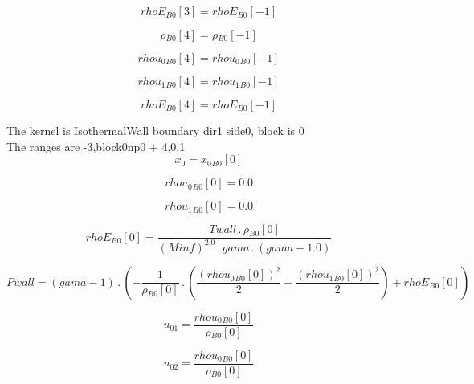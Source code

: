 \documentclass{article}
\begin{document}
\begin{dmath}{rhoE{_{B0}}}[{3}] = {rhoE{_{B0}}}[{-1}]\end{dmath}

\begin{dmath}{\rho{_{B0}}}[{4}] = {\rho{_{B0}}}[{-1}]\end{dmath}

\begin{dmath}{rhou_{0}{_{B0}}}[{4}] = {rhou_{0}{_{B0}}}[{-1}]\end{dmath}

\begin{dmath}{rhou_{1}{_{B0}}}[{4}] = {rhou_{1}{_{B0}}}[{-1}]\end{dmath}

\begin{dmath}{rhoE{_{B0}}}[{4}] = {rhoE{_{B0}}}[{-1}]\end{dmath}

\noindent The kernel is IsothermalWall boundary dir1 side0, block is 0\\\noindent The ranges are -3,block0np0 + 4,0,1\\\begin{dmath}x_{0} = {x_{0}{_{B0}}}[{0}]\end{dmath}

\begin{dmath}{rhou_{0}{_{B0}}}[{0}] = 0.0\end{dmath}

\begin{dmath}{rhou_{1}{_{B0}}}[{0}] = 0.0\end{dmath}

\begin{dmath}{rhoE{_{B0}}}[{0}] = \frac{Twall \,.\, {\rho{_{B0}}}[{0}]}{\left(Minf \right)^{2.0} \,.\, gama \,.\, \left(gama - 1.0\right)}\end{dmath}

\begin{dmath}Pwall = \left(gama - 1\right) \,.\, \left(- \frac{1}{{\rho{_{B0}}}[{0}]} \,.\, \left(\frac{\left({rhou_{0}{_{B0}}}[{0}] \right)^{2}}{2} + \frac{\left({rhou_{1}{_{B0}}}[{0}] \right)^{2}}{2}\right) + {rhoE{_{B0}}}[{0}]\right)\end{dmath}

\begin{dmath}u_{01} = \frac{{rhou_{0}{_{B0}}}[{0}]}{{\rho{_{B0}}}[{0}]}\end{dmath}

\begin{dmath}u_{02} = \frac{{rhou_{0}{_{B0}}}[{0}]}{{\rho{_{B0}}}[{0}]}\end{dmath}
\end{document}
